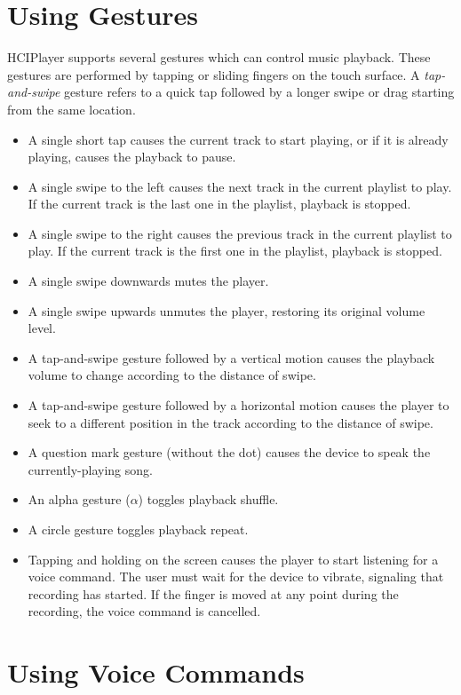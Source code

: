 \documentclass[12pt,letterpaper]{article}
\begin{document}
\section{Using Gestures}

HCIPlayer supports several gestures which can control music playback. These gestures are performed by tapping or sliding fingers on the touch surface. A \emph{tap-and-swipe} gesture refers to a quick tap followed by a longer swipe or drag starting from the same location.

\begin{itemize}
\item A single short tap causes the current track to start playing, or if it is already playing, causes the playback to pause.
\item A single swipe to the left causes the next track in the current playlist to play. If the current track is the last one in the playlist, playback is stopped.
\item A single swipe to the right causes the previous track in the current playlist to play. If the current track is the first one in the playlist, playback is stopped.
\item A single swipe downwards mutes the player.
\item A single swipe upwards unmutes the player, restoring its original volume level.
\item {\color{red} A tap-and-swipe gesture followed by a vertical motion causes the playback volume to change according to the distance of swipe.}
\item {\color{red} A tap-and-swipe gesture followed by a horizontal motion causes the player to seek to a different position in the track according to the distance of swipe.}
\item {\color{red} A question mark gesture (without the dot) causes the device to speak the currently-playing song.}
\item {\color{red} An alpha gesture ($\alpha$) toggles playback shuffle.}
\item {\color{red} A circle gesture toggles playback repeat.}
\item Tapping and holding on the screen causes the player to start listening for a voice command. The user must wait for the device to vibrate, signaling that recording has started. If the finger is moved at any point during the recording, the voice command is cancelled. 
\end{itemize}

\section{Using Voice Commands}
\end{document}
